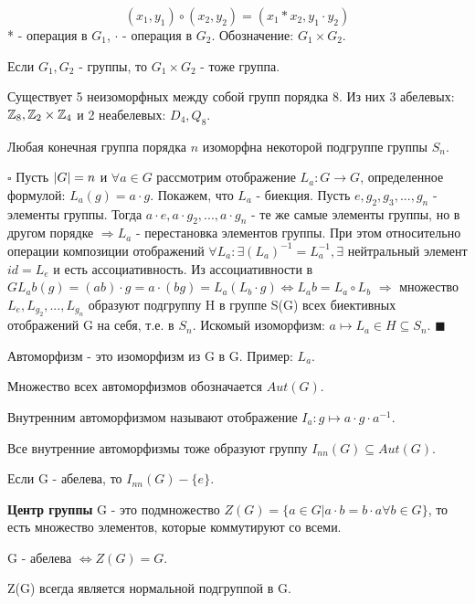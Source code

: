 \documentclass[../main.tex]{subfiles}
\begin{document}
$$(x_1, y_1) \circ (x_2, y_2) = (x_1 * x_2, y_1 \cdot y_2)$$
* - операция в $G_1$, $\cdot$ - операция в $G_2$.
Обозначение: $G_1\times G_2$.

\void
{} Если $G_1, G_2$ - группы, то $G_1\times G_2$ - тоже группа.

\void
{} Существует 5 неизоморфных между собой групп порядка 8. Из них 3
абелевых: $\mathbb{Z}_8, \mathbb{Z}_2\times\mathbb{Z}_4$ и 2 неабелевых: $D_4, Q_8$.

\void
{}

Любая конечная группа порядка $n$ изоморфна некоторой подгруппе группы $S_n$.

\void
$\square$ Пусть $\vert G\vert = n$ и $\forall a\in G$ рассмотрим отображение
$L_a: G\rightarrow G$, определенное формулой: $L_a(g) = a\cdot g$. Покажем, что
$L_a$ - биекция. Пусть $e, g_2, g_3,...,g_n$ - элементы группы. Тогда
$a\cdot e, a\cdot g_2,...,a\cdot g_n$ - те же самые элементы группы, но в
другом порядке $\Longrightarrow L_a$ - перестановка элементов группы.
При этом относительно операции композиции отображений $\forall L_a: \exists (L_a)^{-1} =
L_a^{-1}, \exists$ нейтральный элемент $id = L_e$ и есть ассоциативность. Из ассоциативности
в $G L_ab(g) = (ab)\cdot g = a\cdot (bg) = L_a(L_b\cdot g) \Leftrightarrow L_ab = L_a\circ L_b$
$\Rightarrow$ множество $L_e, L_{g_2},...,L_{g_n}$ образуют подгруппу H в группе S(G) всех
биективных отображений G на себя, т.е. в $S_n$. Искомый изоморфизм:
$a \mapsto L_a\in H\subseteq S_n$. $\blacksquare$ 

\void{} Автоморфизм - это изоморфизм из G в G. Пример: $L_a$.

\void{} Множество всех автоморфизмов обозначается $Aut(G)$.

\void{} Внутренним автоморфизмом называют отображение $I_a: g\mapsto a\cdot g\cdot a^{-1}$.

\void{} Все внутренние автоморфизмы тоже образуют группу
$I_{nn}(G)\subseteq Aut(G)$.

\void{} Если G - абелева, то $I_{nn}(G) - \{e\}$.

\void{} \textbf{Центр группы} G - это подмножество $Z(G) = \{a\in G\vert a\cdot b = b\cdot a \forall b\in G\}$, то
есть множество элементов, которые коммутируют со всеми.

\void{} G - абелева $\Longleftrightarrow Z(G) = G$.

\void{} Z(G) всегда является нормальной подгруппой в G.
\end{document}
